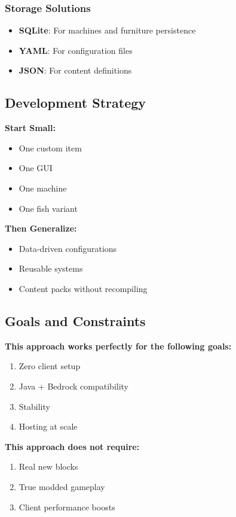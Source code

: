 \documentclass{article}
\begin{document}
\subsubsection{Storage Solutions}

\begin{itemize}
    \item \textbf{SQLite}: For machines and furniture persistence
    \item \textbf{YAML}: For configuration files
    \item \textbf{JSON}: For content definitions
\end{itemize}

\subsection{Development Strategy}

\textbf{Start Small:}
\begin{itemize}
    \item One custom item
    \item One GUI
    \item One machine
    \item One fish variant
\end{itemize}

\textbf{Then Generalize:}
\begin{itemize}
    \item Data-driven configurations
    \item Reusable systems
    \item Content packs without recompiling
\end{itemize}

\subsection{Goals and Constraints}

\textbf{This approach works perfectly for the following goals:}
\begin{enumerate}
    \item Zero client setup
    \item Java + Bedrock compatibility
    \item Stability
    \item Hosting at scale
\end{enumerate}

\textbf{This approach does not require:}
\begin{enumerate}
    \item Real new blocks
    \item True modded gameplay
    \item Client performance boosts
\end{enumerate}
\end{document}
